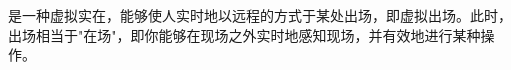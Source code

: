 
\item [远程呈现(telepresence)] 是一种虚拟实在，能够使人实时地以远程的方式于某处出场，即虚拟出场。此时，出场相当于"在场"，即你能够在现场之外实时地感知现场，并有效地进行某种操作。

